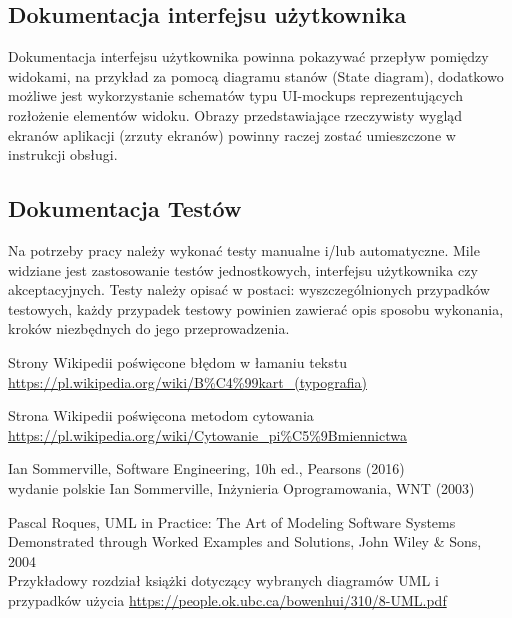 \documentclass[12pt,a4paper]{article}
\begin{document}
\subsection{Dokumentacja interfejsu użytkownika}
Dokumentacja interfejsu użytkownika powinna pokazywać przepływ pomiędzy widokami, na przykład za pomocą diagramu stanów (State diagram), dodatkowo możliwe jest wykorzystanie schematów typu UI-mockups reprezentujących rozłożenie elementów widoku. Obrazy przedstawiające rzeczywisty wygląd ekranów aplikacji (zrzuty ekranów) powinny raczej zostać umieszczone w instrukcji obsługi.


\subsection{Dokumentacja Testów}

Na potrzeby pracy należy wykonać testy manualne i/lub automatyczne. Mile widziane jest zastosowanie testów jednostkowych, interfejsu użytkownika czy akceptacyjnych. Testy należy opisać w postaci: wyszczególnionych przypadków testowych, każdy przypadek testowy powinien zawierać opis sposobu wykonania, kroków niezbędnych do jego przeprowadzenia.








 Strony Wikipedii poświęcone błędom w łamaniu tekstu\\
\url{https://pl.wikipedia.org/wiki/B%C4%99kart_(typografia)}

 Strona Wikipedii poświęcona metodom cytowania \\
\url{https://pl.wikipedia.org/wiki/Cytowanie_pi%C5%9Bmiennictwa}

 Ian Sommerville, Software Engineering, 10h ed., Pearsons  (2016)\\
 wydanie polskie Ian Sommerville, Inżynieria Oprogramowania, WNT (2003)

 Pascal Roques, UML in Practice: The Art of Modeling Software Systems Demonstrated through Worked Examples and Solutions, John Wiley \& Sons, 2004\\
    Przykładowy rozdział książki dotyczący wybranych diagramów UML i przypadków użycia \url{https://people.ok.ubc.ca/bowenhui/310/8-UML.pdf}
\end{document}
